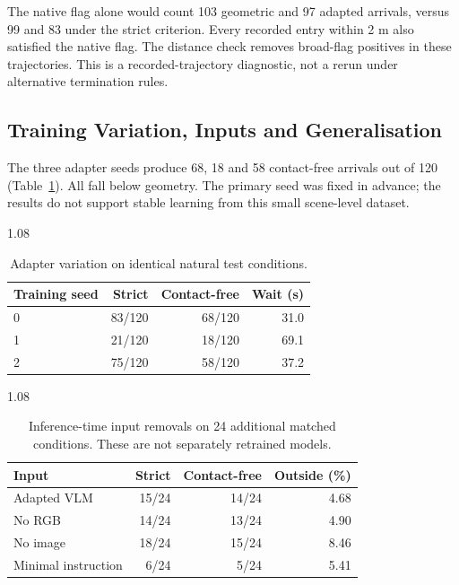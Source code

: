 \documentclass[a4paper,12pt]{article}
\begin{document}
The native flag alone would count 103 geometric and 97 adapted arrivals, versus 99 and 83 under the strict criterion. Every recorded entry within 2 m also satisfied the native flag. The distance check removes broad-flag positives in these trajectories. This is a recorded-trajectory diagnostic, not a rerun under alternative termination rules.

\subsection{Training Variation, Inputs and Generalisation}
The three adapter seeds produce 68, 18 and 58 contact-free arrivals out of 120 (Table~\ref{tab:seeds}). All fall below geometry. The primary seed was fixed in advance; the results do not support stable learning from this small scene-level dataset.

\begin{table}[ht]\centering\small\begin{spacing}{1.08}
\caption{Adapter variation on identical natural test conditions.}\label{tab:seeds}
\begin{tabular}{lrrr}\toprule
Training seed & Strict & Contact-free & Wait (s)\\\midrule
0 & 83/120 & 68/120 & 31.0 \\
1 & 21/120 & 18/120 & 69.1 \\
2 & 75/120 & 58/120 & 37.2 \\
\bottomrule\end{tabular}\end{spacing}\end{table}

\begin{table}[ht]\centering\small\begin{spacing}{1.08}
\caption{Inference-time input removals on 24 additional matched conditions. These are not separately retrained models.}\label{tab:ablation}
\begin{tabular}{lrrr}\toprule
Input & Strict & Contact-free & Outside (\%)\\\midrule
Adapted VLM & 15/24 & 14/24 & 4.68 \\
No RGB & 14/24 & 13/24 & 4.90 \\
No image & 18/24 & 15/24 & 8.46 \\
Minimal instruction & 6/24 & 5/24 & 5.41 \\
\bottomrule\end{tabular}\end{spacing}\end{table}
\end{document}
